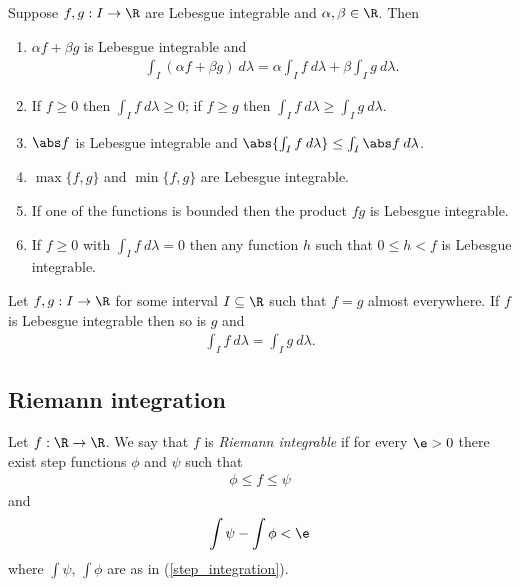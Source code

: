 \documentclass{article}
\begin{document}
\begin{theorem}[Notes 4.2]
	Suppose $f,g:I\to\R$ are Lebesgue integrable and $\alpha,\beta\in\R$. Then
	\begin{enumerate}
		\item $\alpha f + \beta g$ is Lebesgue integrable and \begin{align*}
			      \int_I (\alpha f + \beta g)\:d\lambda = \alpha \int_I f\:d\lambda + \beta \int_I g\:d\lambda.
		      \end{align*}
		\item If $f\geq 0$ then $\int_I f\:d\lambda \geq 0$; if $f\geq g$ then
		      $\int_I f\:d\lambda\geq \int_I g\:d\lambda$.
		\item $\abs f$ is Lebesgue integrable and $\abs{\int_I f\:d\lambda}\leq \int_I \abs f\:d\lambda$.
		\item $\max\{f,g\}$ and $\min\{f,g\}$ are Lebesgue integrable.
		\item If one of the functions is bounded then the product $fg$ is Lebesgue integrable.
		\item If $f\geq 0$ with $\int_I f\:d\lambda = 0$ then any function $h$ such that $0\leq h<f$ is Lebesgue integrable.
	\end{enumerate}
\end{theorem}

\begin{lemma}[Exercise 4.6]
	Let $f,g:I\to\R$ for some interval $I\subseteq\R$ such that $f=g$ almost everywhere.
	If $f$ is Lebesgue integrable then so is $g$ and
	\begin{align*}
		\int_I f\:d\lambda = \int_I g\:d\lambda.
	\end{align*}
\end{lemma}

\subsection{Riemann integration}

\begin{definition}
	Let $f:\R\to\R$. We say that $f$ is \emph{Riemann integrable} if for every
	$\e>0$ there exist step functions $\phi$ and $\psi$ such that
	\begin{align*}
		\phi \leq f \leq \psi
	\end{align*}
	and
	\begin{align*}
		\int \psi - \int \phi < \e
	\end{align*}
	where $\int\psi$, $\int\phi$ are as in (\ref{step_integration}).
\end{definition}
\end{document}
